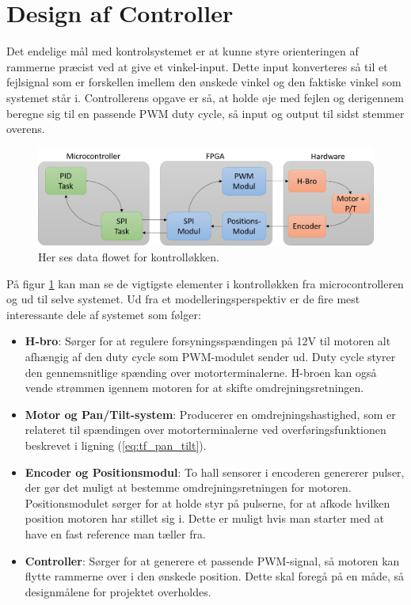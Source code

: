 \section{Design af Controller}

Det endelige mål med kontrolsystemet er at kunne styre orienteringen af rammerne præcist ved at give et vinkel-input. Dette input konverteres så til et fejlsignal som er forskellen imellem den ønskede vinkel og den faktiske vinkel som systemet står i. Controllerens opgave er så, at holde øje med fejlen og derigennem beregne sig til en passende PWM duty cycle, så input og output til sidst stemmer overens. 

\begin{figure}[ht]
	\begin{center}
		\includegraphics[scale=0.5]{Billeder/Controller_Blok.png}
	\end{center}
\caption{Her ses data flowet for kontrolløkken.}
\label{fig:Blok_Model}
\end{figure}

På figur \ref{fig:Blok_Model} kan man se de vigtigste elementer i kontrolløkken fra microcontrolleren og ud til selve systemet. Ud fra et modelleringsperspektiv er de fire mest interessante dele af systemet som følger:

\begin{itemize}
\item \textbf{H-bro}: Sørger for at regulere forsyningsspændingen på 12V til motoren alt afhængig af den duty cycle som PWM-modulet sender ud. Duty cycle styrer den gennemsnitlige spænding over motorterminalerne. H-broen kan også vende strømmen igennem motoren for at skifte omdrejningsretningen.
\item \textbf{Motor og Pan/Tilt-system}: Producerer en omdrejningshastighed, som er relateret til spændingen over motorterminalerne ved overføringsfunktionen beskrevet i ligning (\ref{eq:tf_pan_tilt}).
\item \textbf{Encoder og Positionsmodul}: To hall sensorer i encoderen genererer pulser, der gør det muligt at bestemme omdrejningsretningen for motoren. Positionsmodulet sørger for at holde styr på pulserne, for at afkode hvilken position motoren har stillet sig i. Dette er muligt hvis man starter med at have en fast reference man tæller fra.
\item \textbf{Controller}: Sørger for at generere et passende PWM-signal, så motoren kan flytte rammerne over i den ønskede position. Dette skal foregå på en måde, så designmålene for projektet overholdes.
\end{itemize}

